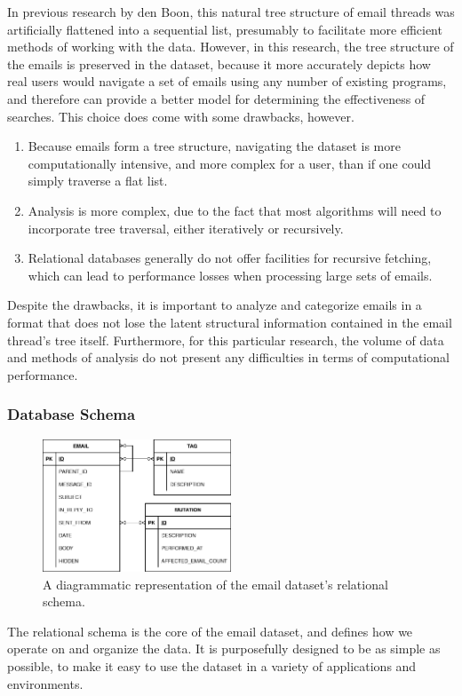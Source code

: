 \documentclass[a4paper, 12pt]{article}
\begin{document}
			In previous research by den Boon, this natural tree structure of email threads was artificially flattened into a sequential list, presumably to facilitate more efficient methods of working with the data\cite{denboon}. However, in this research, the tree structure of the emails is preserved in the dataset, because it more accurately depicts how real users would navigate a set of emails using any number of existing programs, and therefore can provide a better model for determining the effectiveness of searches. This choice does come with some drawbacks, however.
			
			\begin{enumerate}
				\item Because emails form a tree structure, navigating the dataset is more computationally intensive, and more complex for a user, than if one could simply traverse a flat list.
				\item Analysis is more complex, due to the fact that most algorithms will need to incorporate tree traversal, either iteratively or recursively.
				\item Relational databases generally do not offer facilities for recursive fetching, which can lead to performance losses when processing large sets of emails.
			\end{enumerate}
			
			Despite the drawbacks, it is important to analyze and categorize emails in a format that does not lose the latent structural information contained in the email thread's tree itself. Furthermore, for this particular research, the volume of data and methods of analysis do not present any difficulties in terms of computational performance.
		
		\subsubsection{Database Schema}
			\begin{figure}
				\label{fig:schema}
				\includegraphics[width=0.5\textwidth]{img/simple_schema.png}
				\caption{A diagrammatic representation of the email dataset's relational schema.}
			\end{figure}
			The relational schema is the core of the email dataset, and defines how we operate on and organize the data. It is purposefully designed to be as simple as possible, to make it easy to use the dataset in a variety of applications and environments.
			
\end{document}
